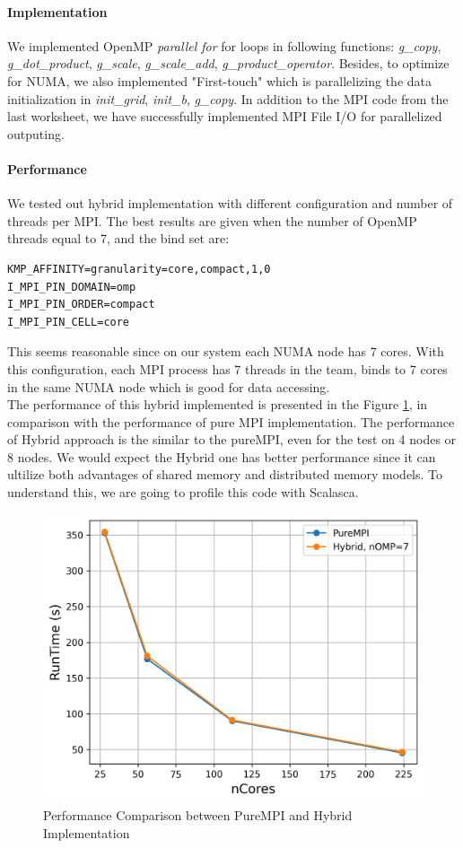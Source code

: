 \documentclass[article]{scrartcl}
\begin{document}
\paragraph{Implementation}
We implemented OpenMP \textit{parallel for} for loops in following functions: \textit{g\_copy}, \textit{g\_dot\_product}, \textit{g\_scale}, \textit{g\_scale\_add}, \textit{g\_product\_operator}. Besides, to optimize for NUMA, we also implemented "First-touch" which is parallelizing the data initialization in \textit{init\_grid}, \textit{init\_b}, \textit{g\_copy}.
In addition to the MPI code from the last worksheet, we have successfully implemented MPI File I/O for parallelized outputing. 
\paragraph{Performance}
We tested out hybrid implementation with different configuration and number of threads per MPI. The best results are given when the number of OpenMP threads equal to 7, and the bind set are:
\begin{verbatim}
KMP_AFFINITY=granularity=core,compact,1,0
I_MPI_PIN_DOMAIN=omp 
I_MPI_PIN_ORDER=compact
I_MPI_PIN_CELL=core
\end{verbatim}
This seems reasonable since on our system each NUMA node has 7 cores. With this configuration, each MPI process has 7 threads in the team, binds to 7 cores in the same NUMA node which is good for data accessing. \\
The performance of this hybrid implemented is presented in the Figure \ref{fig:compare_hybrid}, in comparison with the performance of pure MPI implementation. The performance of Hybrid approach is the similar to the pureMPI, even for the test on 4 nodes or 8 nodes. We would expect the Hybrid one has better performance since it can ultilize both advantages of shared memory and distributed memory models. To understand this, we are going to profile this code with Scalasca.   

\begin{figure}[htpb]
	\centering
	\includegraphics[width=.75\textwidth,keepaspectratio=true]{../figs/3_hybrid_vs_mpi.png}
	\caption{Performance Comparison between PureMPI and Hybrid Implementation}
	\label{fig:compare_hybrid}
\end{figure}
\end{document}
